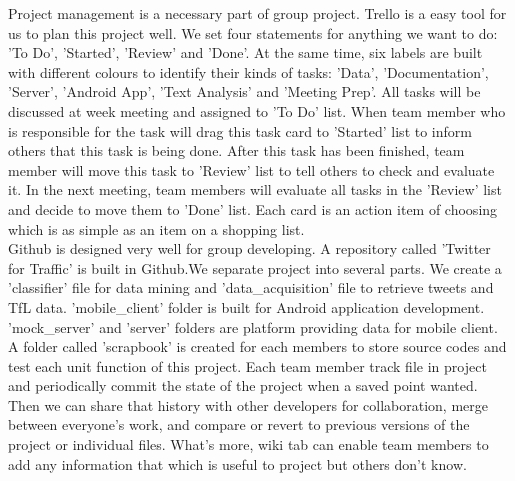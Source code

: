 Project management is a necessary part of group  project. Trello is a easy tool for us to plan this project well. We set four statements for anything we want to do: 'To Do', 'Started', 'Review' and 'Done'. At the same time, six labels are built with different colours to identify their kinds of tasks: 'Data', 'Documentation', 'Server', 'Android App', 'Text Analysis' and 'Meeting Prep'. All tasks will be discussed at week meeting and assigned to 'To Do' list. When team member who is responsible for the task will drag this task card to 'Started' list to inform others that this task is being done. After this task has been finished, team member will move this task to 'Review' list to tell others to check and evaluate it. In the next meeting, team members will evaluate all tasks in the 'Review' list and decide to move them to 'Done' list. Each card is an action item of choosing which is as simple as an item on a shopping list.\\
Github is designed very well for group developing. A repository called 'Twitter for Traffic' is built in Github.We separate project into several parts. We create a 'classifier' file for data mining and 'data\_acquisition' file to retrieve tweets and TfL data. 'mobile\_client' folder is built for Android application development. 'mock\_server' and 'server' folders are platform providing data for mobile client. A folder called 'scrapbook' is created for each members to store source codes and test each unit function of this project. Each team member track file in project and periodically commit the state of the project when a saved point wanted. Then we can share that history with other developers for collaboration, merge between everyone's work, and compare or revert to previous versions of the project or individual files. What's more, wiki tab can enable team members to add any information that which is useful to project but others don't know.\\
